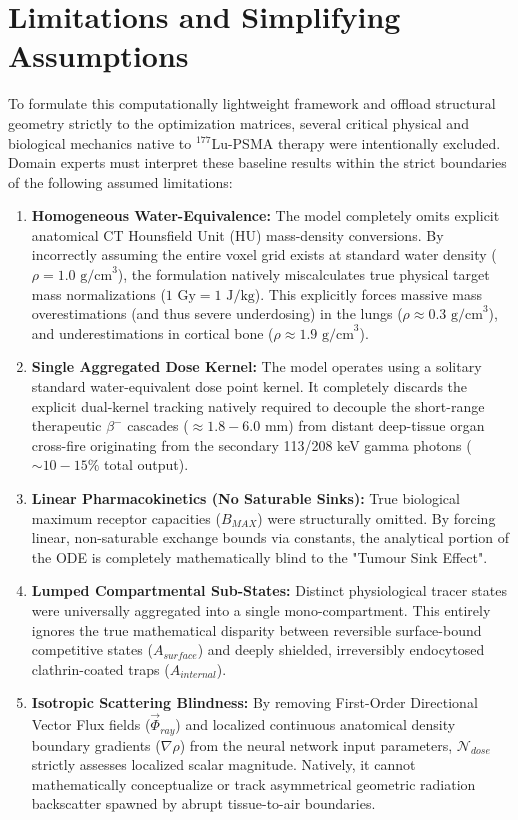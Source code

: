 \documentclass[11pt,a4paper]{article}
\begin{document}
\section{Limitations and Simplifying Assumptions}

To formulate this computationally lightweight framework and offload structural geometry strictly to the optimization matrices, several critical physical and biological mechanics native to $^{177}$Lu-PSMA therapy were intentionally excluded. Domain experts must interpret these baseline results within the strict boundaries of the following assumed limitations:

\begin{enumerate}
    \item \textbf{Homogeneous Water-Equivalence:} The model completely omits explicit anatomical CT Hounsfield Unit (HU) mass-density conversions. By incorrectly assuming the entire voxel grid exists at standard water density ($\rho = 1.0 \text{ g/cm}^3$), the formulation natively miscalculates true physical target mass normalizations ($1 \text{ Gy} = 1 \text{ J/kg}$). This explicitly forces massive mass overestimations (and thus severe underdosing) in the lungs ($\rho \approx 0.3 \text{ g/cm}^3$), and underestimations in cortical bone ($\rho \approx 1.9 \text{ g/cm}^3$).
    \item \textbf{Single Aggregated Dose Kernel:} The model operates using a solitary standard water-equivalent dose point kernel. It completely discards the explicit dual-kernel tracking natively required to decouple the short-range therapeutic $\beta^-$ cascades ($\approx 1.8 - 6.0 \text{ mm}$) from distant deep-tissue organ cross-fire originating from the secondary 113/208 keV gamma photons ($\sim 10-15\%$ total output).
    \item \textbf{Linear Pharmacokinetics (No Saturable Sinks):} True biological maximum receptor capacities ($B_{MAX}$) were structurally omitted. By forcing linear, non-saturable exchange bounds via constants, the analytical portion of the ODE is completely mathematically blind to the "Tumour Sink Effect".
    \item \textbf{Lumped Compartmental Sub-States:} Distinct physiological tracer states were universally aggregated into a single mono-compartment. This entirely ignores the true mathematical disparity between reversible surface-bound competitive states ($A_{surface}$) and deeply shielded, irreversibly endocytosed clathrin-coated traps ($A_{internal}$).
    \item \textbf{Isotropic Scattering Blindness:} By removing First-Order Directional Vector Flux fields ($\vec{\Phi}_{ray}$) and localized continuous anatomical density boundary gradients ($\nabla \rho$) from the neural network input parameters, $\mathcal{N}_{dose}$ strictly assesses localized scalar magnitude. Natively, it cannot mathematically conceptualize or track asymmetrical geometric radiation backscatter spawned by abrupt tissue-to-air boundaries.

\end{enumerate}
\end{document}
